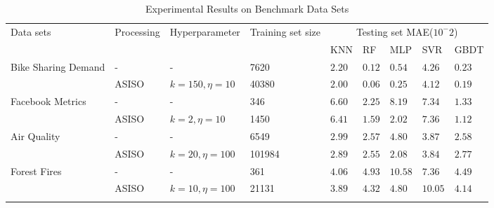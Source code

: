 \documentclass[sn-mathphys,Numbered]{sn-jnl}%
\theoremstyle{thmstyleone}%
\theoremstyle{thmstyletwo}%
\theoremstyle{thmstylethree}%
\begin{document}
\begin{table}
\caption{Experimental Results on Benchmark Data Sets}\label{tab2}
\begin{tabular*}{\textheight}{@{\extracolsep\fill}lllllllll}
\toprule%
\multirow{2}{*}{Data sets}           & \multirow{2}{*}{Processing} & \multirow{2}{*}{Hyperparameter} & \multirow{2}{*}{Training set size} & \multicolumn{5}{c}{Testing set MAE($10^-2$)}                                                                      \\ \cmidrule{5-9}
                                     &                             &                                 &                                    & KNN                & RF                 & MLP                 & SVR                 & GBDT               \\ \hline
\multirow{2}{*}{Bike Sharing Demand} & -                           & -                               & 7620                               & $2.20$  & $\boldsymbol{0.12}$ & $0.54$   & $4.26$ & $0.23$ \\
                                     & ASISO                       & $k=150,\eta=10$                 & 40380                              & $2.00$    & $\boldsymbol{0.06}$    & $0.25$   & $4.12$  & $0.19$  \\
\multirow{2}{*}{Facebook Metrics}    & -                           & -                               & 346                                & $6.60$  & $2.25$ & $8.19$  & $7.34$  & $\boldsymbol{1.33}$ \\
                                     & ASISO                       & $k=2,\eta=10$                   & 1450                               & $6.41$ & $1.59$ & $2.02$  & $7.36$  & $\boldsymbol{1.12}$ \\
\multirow{2}{*}{Air Quality}         & -                           & -                               & 6549                               & $2.99$ & $\boldsymbol{2.57}$ & $4.80$   & $3.87$  & $2.58$ \\
                                     & ASISO                       & $k=20,\eta=100$                 & 101984                             & $2.89$ & $2.55$ & $\boldsymbol{2.08}$  & $3.84$  & $2.77$ \\
\multirow{2}{*}{Forest Fires}        & -                           & -                               & 361                                & $\boldsymbol{4.06}$ & $4.93$ & $10.58$ & $7.36$  & $4.49$ \\
                                     & ASISO                       & $k=10,\eta=100$                 & 21131                              & $\boldsymbol{3.89}$ & $4.32$ & $4.80$   & $10.05$ & $4.14$ \\
\botrule
\end{tabular*}
\end{table}
\end{document}
